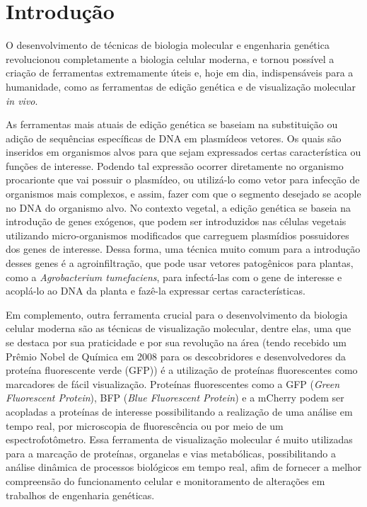 \section{Introdução} 
O desenvolvimento de técnicas de biologia molecular e engenharia genética
revolucionou completamente a biologia celular moderna, e tornou possível a
criação de ferramentas extremamente úteis e, hoje em dia, indispensáveis para a
humanidade\cite{teófilo_gallão_2019}, como as ferramentas de edição genética e
de visualização molecular \textit{in vivo}.

As ferramentas mais atuais de edição genética se baseiam na substituição ou
adição de sequências específicas de DNA em plasmídeos
vetores\cite{BriefyHistoryOfGenetics}. Os quais são inseridos em organismos
alvos para que sejam expressados certas característica ou funções de interesse.
Podendo tal expressão ocorrer diretamente no organismo procarionte que vai
possuir o plasmídeo\cite{ruiz_silhavy_2022}, ou utilizá-lo como vetor para
infecção de organismos mais complexos, e assim, fazer com que o segmento
desejado se acople no DNA do organismo alvo. No contexto vegetal, a edição
genética se baseia na introdução de genes exógenos, que podem ser introduzidos
nas células vegetais utilizando micro-organismos modificados que carreguem
plasmídios possuidores dos genes de interesse\cite{embrapa2017manual}. Dessa
forma, uma técnica muito comum para a introdução desses genes é a
agroinfiltração, que pode usar vetores patogênicos para plantas, como a
\textit{Agrobacterium tumefaciens}, para infectá-las com o gene de interesse e
acoplá-lo ao DNA da planta e fazê-la expressar certas
características\cite{embrapa2017manual}.

Em complemento, outra ferramenta crucial para o desenvolvimento da biologia
celular moderna são as técnicas de visualização molecular, dentre elas, uma que
se destaca por sua praticidade e por sua revolução na área (tendo recebido um
Prêmio Nobel de Química em 2008 para os descobridores e desenvolvedores da
proteína fluorescente verde (GFP)\cite{jeremy_jackson_2009}) é a utilização de
proteínas fluorescentes como marcadores de fácil visualização. Proteínas
fluorescentes como a GFP (\textit{Green Fluorescent Protein}), BFP (\textit{Blue
Fluorescent Protein}) e a mCherry podem ser acopladas a proteínas de interesse
possibilitando a realização de uma análise em tempo real, por microscopia de
fluorescência ou por meio de um espectrofotômetro.  Essa ferramenta de
visualização molecular é muito utilizadas para a marcação de proteínas,
organelas e vias metabólicas, possibilitando a análise dinâmica de processos
biológicos em tempo real, afim de fornecer a melhor compreensão do funcionamento
celular e monitoramento de alterações em trabalhos de engenharia
genéticas\cite{misteli_spector_1997}. 

